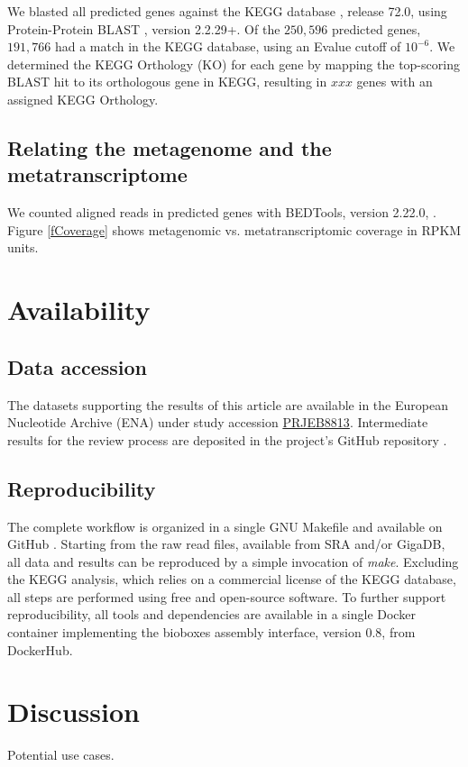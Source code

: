 \documentclass{bmcart}
\begin{document}
We blasted all predicted genes against the KEGG database \cite{KeggDB}, release 72.0, using Protein-Protein BLAST \cite{BlastPlus}, version 2.2.29+. 
Of the $250,596$ predicted genes, $191,766$ had a match in the KEGG database, using an Evalue cutoff of $10^{-6}$.
We determined the KEGG Orthology (KO) for each gene by mapping the top-scoring BLAST hit to its orthologous gene in KEGG, resulting in $xxx$ genes with an assigned KEGG Orthology.

\subsection*{Relating the metagenome and the metatranscriptome}
We counted aligned reads in predicted genes with BEDTools, version 2.22.0, \cite{BEDTools}.
Figure \ref{fCoverage} shows metagenomic vs. metatranscriptomic coverage in RPKM units.

\section*{Availability}
\subsection*{Data accession}
The datasets supporting the results of this article are available in the European Nucleotide Archive (ENA) under study accession \href{http://www.ebi.ac.uk/ena/data/view/PRJEB8813}{PRJEB8813}.
Intermediate results for the review process are deposited in the project's GitHub repository \cite{GitHub}.

\subsection*{Reproducibility}
The complete workflow is organized in a single GNU Makefile and available on GitHub \cite{GitHub}.
Starting from the raw read files, available from SRA and/or GigaDB, all data and results can be reproduced by a simple invocation of \emph{make}.
Excluding the KEGG analysis, which relies on a commercial license of the KEGG database, all steps are performed using free and open-source software.
To further support reproducibility, all tools and dependencies are available in a single Docker container implementing the bioboxes assembly interface, version 0.8, from DockerHub.

\section*{Discussion}
Potential use cases.
\end{document}
